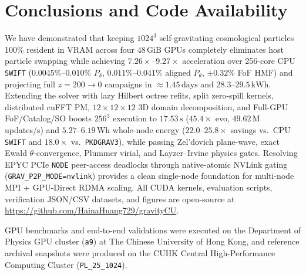 \documentclass[aps,prd,reprint,superscriptaddress,nofootinbib,amsmath,amssymb,floatfix,longbibliography]{revtex4-2}
\begin{document}
\section{Conclusions and Code Availability}\label{sec:conc}

We have demonstrated that keeping $1024^3$ self-gravitating cosmological particles 100\% resident in VRAM across four $48\,\mathrm{GiB}$ GPUs completely eliminates host particle swapping while achieving $7.26\times$--$9.27\times$ acceleration over 256-core CPU \texttt{SWIFT} ($0.0045\%$--$0.010\%$ $P_\delta$, $0.011\%$--$0.041\%$ aligned $P_\theta$, $\pm 0.32\%$ FoF HMF) and projecting full $z = 200 \rightarrow 0$ campaigns in $\approx 1.45\,\mathrm{days}$ and $28.3$--$29.5\,\mathrm{kWh}$. Extending the solver with lazy Hilbert octree refits, split zero-spill kernels, distributed cuFFT PM, $12\times 12\times 12$ 3D domain decomposition, and Full-GPU FoF/Catalog/SO boosts $256^3$ execution to $17.53\,\mathrm{s}$ ($45.4\times$ evo, $49.62\,\mathrm{M}$ updates/s) and $5.27$--$6.19\,\mathrm{Wh}$ whole-node energy ($22.0$--$25.8\times$ savings vs.\ CPU \texttt{SWIFT} and $18.0\times$ vs.\ \texttt{PKDGRAV3}), while passing Zel'dovich plane-wave, exact Ewald $\theta$-convergence, Plummer virial, and Layzer--Irvine physics gates. Resolving EPYC PCIe \texttt{NODE} peer-access deadlocks through native-atomic NVLink gating (\texttt{GRAV\_P2P\_MODE=nvlink}) provides a clean single-node foundation for multi-node MPI + GPU-Direct RDMA scaling. All CUDA kernels, evaluation scripts, verification JSON/CSV datasets, and figures are open-source at \url{https://github.com/HainaHuang729/gravityCU}.

\begin{acknowledgments}
GPU benchmarks and end-to-end validations were executed on the Department of Physics GPU cluster (\texttt{a9}) at The Chinese University of Hong Kong, and reference archival snapshots were produced on the CUHK Central High-Performance Computing Cluster (\texttt{PL\_25\_1024}).
\end{acknowledgments}


\end{document}
